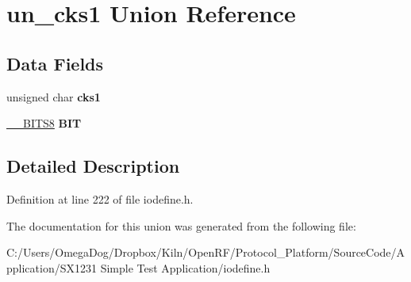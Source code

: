 \hypertarget{unionun__cks1}{\section{un\-\_\-cks1 Union Reference}
\label{unionun__cks1}
}
\subsection*{Data Fields}
\begin{DoxyCompactItemize}
\item 
\hypertarget{unionun__cks1_a18f4e274afe0bc5fd33ede3e570b4a06}{unsigned char {\bfseries cks1}}\label{unionun__cks1_a18f4e274afe0bc5fd33ede3e570b4a06}

\item 
\hypertarget{unionun__cks1_a96b43db656198c4afeae263da9da6863}{\hyperlink{struct_____b_i_t_s8}{\-\_\-\-\_\-\-B\-I\-T\-S8} {\bfseries B\-I\-T}}\label{unionun__cks1_a96b43db656198c4afeae263da9da6863}

\end{DoxyCompactItemize}


\subsection{Detailed Description}


Definition at line 222 of file iodefine.\-h.



The documentation for this union was generated from the following file\-:\begin{DoxyCompactItemize}
\item 
C\-:/\-Users/\-Omega\-Dog/\-Dropbox/\-Kiln/\-Open\-R\-F/\-Protocol\-\_\-\-Platform/\-Source\-Code/\-Application/\-S\-X1231 Simple Test Application/iodefine.\-h\end{DoxyCompactItemize}
